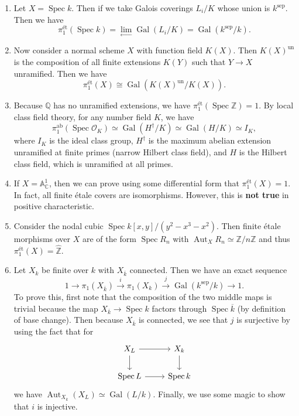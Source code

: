 \documentclass[leqno, openany]{memoir}
\theoremstyle{definition}
\theoremstyle{remark}
\theoremstyle{plain}
\theoremstyle{definition}
\theoremstyle{remark}
\newcommand{\A}{\mathbb{A}}
\newcommand{\C}{\mathbb{C}}
\newcommand{\Z}{\mathbb{Z}}
\newcommand{\Q}{\mathbb{Q}}
\newcommand{\mc}[1]{\mathcal{#1}}
\newcommand{\mr}[1]{\mathrm{#1}}
\newcommand{\ol}[1]{\overline{#1}}
\newcommand{\wh}[1]{\widehat{#1}}
\DeclareMathOperator{\Aut}{Aut}
\DeclareMathOperator{\Gal}{Gal}
\DeclareMathOperator{\Spec}{Spec}
\begin{document}
\begin{enumerate}
    \item Let $X = \Spec k$. Then if we take Galois coverings $L_i / K$ whose union is $k^{\mr{sep}}$. Then we have
        \[ \pi_1^{\text{\'et}}(\Spec k) = \lim_{\longleftarrow} \Gal(L_i/K) = \Gal(k^{\mr{sep}} / k). \] 
    \item Now consider a normal scheme $X$ with function field $K(X)$. Then $K(X)^{\mr{un}}$ is the composition of all finite extensions $K(Y)$ such that $Y \to X$ unramified. Then we have
        \[ \pi_1^{\text{\'et}}(X) \cong \Gal(K(X)^{\mr{un}} / K(X)). \]
    \item Because $\Q$ has no unramified extensions, we have $\pi_1^{\text{\'et}}(\Spec \Z) = 1$. By local class field theory, for any number field $K$, we have
        \[ \pi_1^{\mr{ab}}(\Spec \mc{O}_K) \simeq \Gal(H^{\dag}/K) \simeq \Gal(H/K) \simeq I_K, \]
        where $I_K$ is the ideal class group, $H^{\dag}$ is the maximum abelian extension unramified at finite primes (narrow Hilbert class field), and $H$ is the Hilbert class field, which is unramified at all primes.
    \item If $X = \A^1_{\C}$, then we can prove using some differential form that $\pi_1^{\text{\'et}}(X) = 1$. In fact, all finite \'etale covers are isomorphisms. However, this is \textbf{not true} in positive characteristic.
    \item Consider the nodal cubic $\Spec k[x,y]/(y^2-x^3-x^2)$. Then finite \'etale morphisms over $X$ are of the form $\Spec R_n$ with $\Aut_X R_n \simeq \Z/n\Z$ and thus $\pi_1^{\text{\'et}}(X) = \wh{\Z}$. 
    \item Let $X_k$ be finite over $k$ with $X_{\ol{k}}$ connected. Then we have an exact sequence
        \[ 1 \to \pi_1(X_{\ol{k}}) \xrightarrow{i} \pi_1(X_k) \xrightarrow{j} \Gal(k^{\mr{sep}}/k) \to 1. \]
        To prove this, first note that the composition of the two middle maps is trivial because the map $X_{\ol{k}} \to \Spec k$ factors through $\Spec \ol{k}$ (by definition of base change). Then because $X_{\ol{k}}$ is connected, we see that $j$ is surjective by using the fact that for
        \begin{equation*}
        \begin{tikzcd}
            X_L \arrow{r} \arrow{d} & X_k \arrow{d} \\
            \Spec L \arrow{r} & \Spec k
        \end{tikzcd}
        \end{equation*}
        we have $\Aut_{X_k}(X_L) \simeq \Gal(L/k)$. Finally, we use some magic to show that $i$ is injective.
\end{enumerate}
\end{document}
